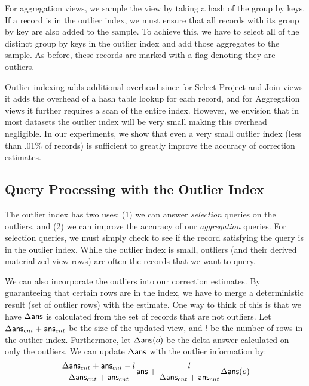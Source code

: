For aggregation views, we sample the view by taking a hash of the group by keys.
If a record is in the outlier index, we must ensure that all records with its group by key are also added to the sample.
To achieve this, we have to select all of the distinct group by keys in the outlier index and add those aggregates to the sample.
As before, these records are marked with a flag denoting they are outliers.

Outlier indexing adds additional overhead since for Select-Project and Join views it adds the overhead of a hash table lookup for each record, and for Aggregation views it further requires a scan of the entire index.
However, we envision that in most datasets the outlier index will be very small making this overhead negligible.
In our experiments, we show that even a very small outlier index (less than .01\% of records) is sufficient to greatly improve the accuracy of
correction estimates.

\subsection{Query Processing with the Outlier Index} 
The outlier index has two uses: (1) we can answer \emph{selection} queries on the outliers, 
and (2) we can improve the accuracy of our \emph{aggregation} queries.
For selection queries, we must simply check to see if the record satisfying the query is in the outlier index.
While the outlier index is small, outliers (and their derived materialized view rows) are often the records that
we want to query.

We can also incorporate the outliers into our correction estimates. 
By guaranteeing that certain rows are in the index, we
have to merge a deterministic result (set of outlier rows) with the
estimate. One way to think of this is that we have $\Delta\textsf{ans}$ is
calculated from the set of records that are not outliers. Let $\Delta\textsf{ans}_{cnt} + \textsf{ans}_{cnt}$
be the size of the updated view, and $l$ be the number of rows in the
outlier index. Furthermore, let $\Delta\textsf{ans}(o)$ be the delta answer calculated on only the outliers.
We can update $\Delta\textsf{ans}$ with the outlier information by:
\[
\frac{\Delta\textsf{ans}_{cnt} + \textsf{ans}_{cnt}-l}{\Delta\textsf{ans}_{cnt} + \textsf{ans}_{cnt}}\textsf{ans}+\frac{l}{\Delta\textsf{ans}_{cnt} + \textsf{ans}_{cnt}}\Delta\textsf{ans}(o)
\]